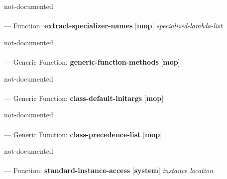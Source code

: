 \begin{adjustwidth}{5em}{5em}
not-documented
\end{adjustwidth}

\paragraph{}
\label{MOP:EXTRACT-SPECIALIZER-NAMES}
--- Function: \textbf{extract-specializer-names} [\textbf{mop}] \textit{specialized-lambda-list}

\begin{adjustwidth}{5em}{5em}
not-documented
\end{adjustwidth}

\paragraph{}
\label{MOP:GENERIC-FUNCTION-METHODS}
--- Generic Function: \textbf{generic-function-methods} [\textbf{mop}] \textit{}

\begin{adjustwidth}{5em}{5em}
not-documented
\end{adjustwidth}

\paragraph{}
\label{MOP:CLASS-DEFAULT-INITARGS}
--- Generic Function: \textbf{class-default-initargs} [\textbf{mop}] \textit{}

\begin{adjustwidth}{5em}{5em}
not-documented
\end{adjustwidth}

\paragraph{}
\label{MOP:CLASS-PRECEDENCE-LIST}
--- Generic Function: \textbf{class-precedence-list} [\textbf{mop}] \textit{}

\begin{adjustwidth}{5em}{5em}
not-documented
\end{adjustwidth}

\paragraph{}
\label{SYSTEM:STANDARD-INSTANCE-ACCESS}
--- Function: \textbf{standard-instance-access} [\textbf{system}] \textit{instance location}


